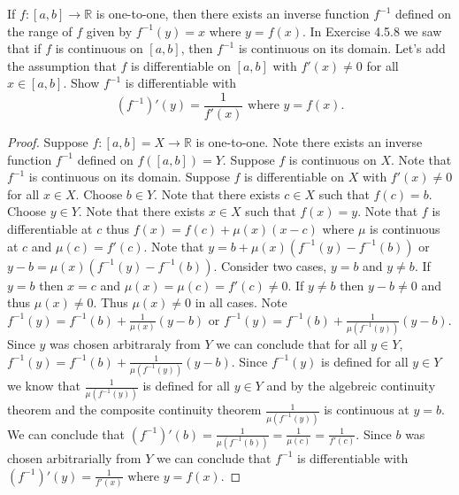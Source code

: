 \documentclass[12pt]{article}
\theoremstyle{homework}
\begin{document}
If $f:[a,b] \to \mathbb{R}$ is one-to-one, then there exists an inverse function $f^{-1}$ defined on the range of $f$ given by $f^{-1}(y) = x$ where $y = f(x)$. In Exercise 4.5.8 we saw that if $f$ is continuous on $[a,b]$, then $f^{-1}$ is continuous on its domain. Let's add the assumption that $f$ is differentiable on $[a,b]$ with $f'(x)\neq 0$ for all $x \in [a,b]$. Show $f^{-1}$ is differentiable with $$(f^{-1})'(y) = \frac{1}{f'(x)} \text{ where } y=f(x).$$
\begin{proof}
Suppose $f:[a,b]=X \to \mathbb{R}$ is one-to-one.  Note there exists an inverse function $f^{-1}$ defined on $f([a,b])=Y$.  Suppose $f$ is continuous on $X$.  Note that $f^{-1}$ is continuous on its domain.  Suppose $f$ is differentiable on $X$ with $f'(x)\neq 0$ for all $x \in X$.  Choose $b\in Y$.  Note that there exists $c\in X$ such that $f(c)=b$.  Choose $y\in Y$.  Note that there exists $x\in X$ such that $f(x)=y$.  Note that $f$ is differentiable at $c$ thus $f(x)=f(c)+\mu(x)(x-c)$ where $\mu$ is continuous at $c$ and $\mu(c)=f'(c)$.  Note that $y=b+\mu(x)(f^{-1}(y)-f^{-1}(b))$ or $y-b=\mu(x)(f^{-1}(y)-f^{-1}(b))$.  Consider two cases, $y=b$ and $y\neq b$.  If $y=b$ then $x=c$ and $\mu(x)=\mu(c)=f'(c)\neq 0$.  If $y\neq b$ then $y-b\neq 0$ and thus $\mu(x)\neq 0$.  Thus $\mu(x)\neq 0$ in all cases.  Note $f^{-1}(y)=f^{-1}(b)+\frac{1}{\mu(x)}(y-b)$ or $f^{-1}(y)=f^{-1}(b)+\frac{1}{\mu(f^{-1}(y))}(y-b)$.  Since $y$ was chosen arbitraraly from $Y$ we can conclude that for all $y\in Y$, $f^{-1}(y)=f^{-1}(b)+\frac{1}{\mu(f^{-1}(y))}(y-b)$.  Since $f^{-1}(y)$ is defined for all $y\in Y$ we know that $\frac{1}{\mu(f^{-1}(y))}$ is defined for all $y\in Y$ and by the algebreic continuity theorem and the composite continuity theorem $\frac{1}{\mu(f^{-1}(y))}$ is continuous at $y=b$.  We can conclude that $(f^{-1})'(b) = \frac{1}{\mu(f^{-1}(b))}=\frac{1}{\mu(c)}=\frac{1}{f'(c)}$.  Since $b$ was chosen arbitrarially from $Y$ we can conclude that $f^{-1}$ is differentiable with $(f^{-1})'(y) = \frac{1}{f'(x)} \text{ where } y=f(x)$.
\end{proof}
\end{document}
